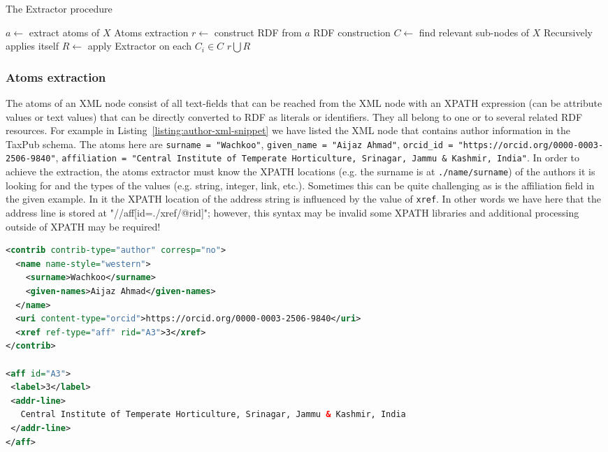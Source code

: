 \begin{algorithm}
\caption{The Extractor procedure}
\begin{algorithmic}[1]
\State $a \leftarrow$ extract atoms of $X$
\Comment Atoms extraction
\State $r \leftarrow$ construct RDF from $a$
\Comment RDF construction
\State $C \leftarrow$ find relevant sub-nodes of $X$
\Comment Recursively applies itself
\State $R \leftarrow$ apply Extractor on each $C_i \in C$
\State \Return $r \bigcup R$
\EndProcedure
\end{algorithmic}
\label{algo:extractor}
\end{algorithm}

\subsubsection{Atoms extraction}

The atoms of an XML node consist of all text-fields that can be reached from the XML node with an XPATH expression (can be attribute values or text values) that can be directly converted to RDF as literals or identifiers. They all belong to one or to several related RDF resources. For example in Listing~\ref{listing:author-xml-snippet} we have listed the XML node that contains author information in the TaxPub schema. The atoms here are {\tt surname = "Wachkoo"}, {\tt given\_name = "Aijaz Ahmad"}, {\tt orcid\_id = "https://orcid.org/0000-0003-2506-9840"}, {\tt affiliation = "Central Institute of Temperate Horticulture, Srinagar, Jammu \& Kashmir, India"}. In order to achieve the extraction, the atoms extractor must know the XPATH locations (e.g. the surname is at {\tt ./name/surname}) of the authors it is looking for and the types of the values (e.g. string, integer, link, etc.). Sometimes this can be quite challenging as is the affiliation field in the given example. In it the XPATH location of the address string is influenced by the value of {\tt xref}. In other words we have here that the address line is stored at "{//aff[id=./xref/@rid]}"; however, this syntax may be invalid some XPATH libraries and additional processing outside of XPATH may be required!

\begin{lstlisting}[language=XML,
caption=XML snippet of an author.,
label=listing:author-xml-snippet, basicstyle=\ttfamily\tiny]
<contrib contrib-type="author" corresp="no">
  <name name-style="western">
    <surname>Wachkoo</surname>
    <given-names>Aijaz Ahmad</given-names>
  </name>
  <uri content-type="orcid">https://orcid.org/0000-0003-2506-9840</uri>
  <xref ref-type="aff" rid="A3">3</xref>
</contrib>  

<aff id="A3">
 <label>3</label>
 <addr-line>
   Central Institute of Temperate Horticulture, Srinagar, Jammu & Kashmir, India
 </addr-line>
</aff>
\end{lstlisting}


